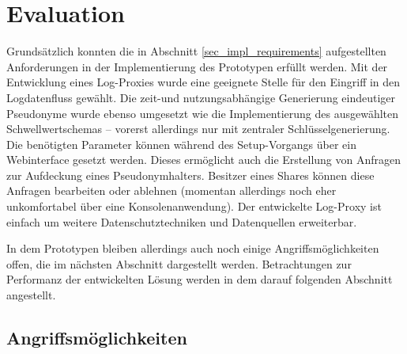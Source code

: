 \section{Evaluation}

\label{sec_impl_evaluation}


Grundsätzlich konnten die in Abschnitt \ref{sec_impl_requirements} aufgestellten Anforderungen in der Implementierung des Prototypen erfüllt werden. Mit der Entwicklung eines Log-Proxies wurde eine geeignete Stelle für den Eingriff in den Logdatenfluss gewählt. Die zeit-und nutzungsabhängige Generierung eindeutiger Pseudonyme wurde ebenso umgesetzt wie die Implementierung des ausgewählten Schwellwertschemas -- vorerst allerdings nur mit zentraler Schlüsselgenerierung. Die benötigten Parameter können während des Setup-Vorgangs über ein Webinterface gesetzt werden. Dieses ermöglicht auch die Erstellung von Anfragen zur Aufdeckung eines Pseudonymhalters. Besitzer eines Shares können diese Anfragen bearbeiten oder ablehnen (momentan allerdings noch eher unkomfortabel über eine Konsolenanwendung). Der entwickelte Log-Proxy ist einfach um weitere Datenschutztechniken und Datenquellen erweiterbar.

In dem Prototypen bleiben allerdings auch noch einige Angriffsmöglichkeiten offen, die im nächsten Abschnitt dargestellt werden. Betrachtungen zur Performanz der entwickelten Lösung werden in dem darauf folgenden Abschnitt angestellt.

\subsection{Angriffsmöglichkeiten}


